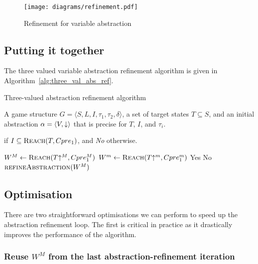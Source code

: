 \begin{figure}[t]
\centering
\texttt{[image: diagrams/refinement.pdf]}
\caption{Refinement for variable abstraction}
\label{fig:var_refinement}
\end{figure}

\subsection{Putting it together}
The three valued variable abstraction refinement algorithm is given in Algorithm~\ref{alg:three_val_abs_ref}.

\begin{algorithm}
\caption{Three-valued abstraction refinement algorithm}
\label{alg:three_val_abs_ref}

\begin{algorithmic}[1]

\Require A game structure $G = \langle S, L, I, \tau_1, \tau_2, \delta \rangle$, a set 
of target states $T\subseteq S$, and an initial abstraction $\alpha=\langle V, \mathord{\downarrow} \rangle$
that is precise for $T$, $I$, and $\tau_i$.

 if $I \subseteq \textsc{Reach}(T, Cpre_1)$, and {\it No} otherwise.


    \Loop
        \State $W^M \gets \textsc{Reach}(T\mathord{\uparrow^M}, Cpre_1^M)$
        \State $W^m \gets \textsc{Reach}(T\mathord{\uparrow^m}, Cpre_1^m)$
            \State\Return Yes
            \State\Return No
        \Else       
            \State$\Call{refineAbstraction}{W^M}$
        \EndIf
    \EndLoop
\EndFunction

\end{algorithmic}
\end{algorithm}

\subsection{Optimisation}

There are two straightforward optimisations we can perform to speed up the abstraction refinement loop. The first is critical in practice as it drastically improves the performance of the algorithm.

\subsubsection{Reuse $W^M$ from the last abstraction-refinement iteration}


